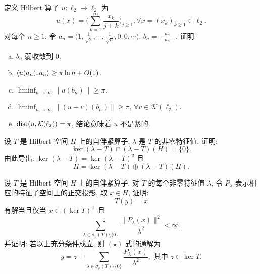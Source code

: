 \begin{exercise}
    定义 Hilbert 算子 $u:\ell_2\to\ell_2$ 为
    \[u(x)=\biggl(\sum_{k=1}^{\infty}\frac{x_k}{j+k}\biggr)_{j\geq 1},\forall x=(x_k)_{k\geq 1}\in\ell_2.\]
    对每个 $n\geq 1$, 令 $a_n=\bigl(1,\frac{1}{\sqrt{2}},\cdots,\frac{1}{\sqrt{n}},0,0,\cdots\bigr)$, $b_n=\frac{a_n}{\|a_n\|}$.
    证明:
    \begin{enumerate}[(a)]
        \item $b_n$ 弱收敛到 $0$.
        \item $\langle u(a_n),a_n\rangle\geq\pi\ln n+O(1)$.
        \item $\liminf_{n\to\infty}\|u(b_n)\|\geq\pi$.
        \item $\liminf_{n\to\infty}\|(u-v)(b_n)\|\geq\pi$, $\forall v\in\mathcal{K}(\ell_2)$.
        \item $\operatorname{dist}(u,\mathcal{K}(\ell_2))=\pi$, 结论意味着 $u$ 不是紧的.
    \end{enumerate}
\end{exercise}



\begin{exercise}
    设 $T$ 是 Hilbert 空间 $H$ 上的自伴紧算子, $\lambda$ 是 $T$ 的非零特征值. 证明:
    \[\ker(\lambda-T)\cap (\lambda-T)(H)=\{0\}.\]
    由此导出: $\ker(\lambda-T)=\ker(\lambda-T)^2$ 且
    \[H=\ker(\lambda-T)\oplus(\lambda-T)(H).\]
\end{exercise}



\begin{exercise}
    设 $T$ 是 Hilbert 空间 $H$ 上的自伴紧算子. 对 $T$ 的每个非零特征值 $\lambda$,
    令 $P_{\lambda}$ 表示相应的特征子空间上的正交投影. 取 $x\in H$, 证明:
    \begin{equation}
        T(y)=x\tag{$\star$}
    \end{equation}
    有解当且仅当 $x\in(\ker T)^{\perp}$ 且
    \[\sum_{\lambda\in\sigma_p(T)\setminus\{0\}} \frac{\|P_{\lambda}(x)\|^2}{\lambda^2}<\infty.\]
    并证明: 若以上充分条件成立, 则 $(\star)$ 式的通解为
    \[y=z+\sum_{\lambda\in\sigma_p(T)\setminus\{0\}} \frac{P_{\lambda}(x)}{\lambda^2},\text{\ 其中\ }z\in\ker T.\]
\end{exercise}



